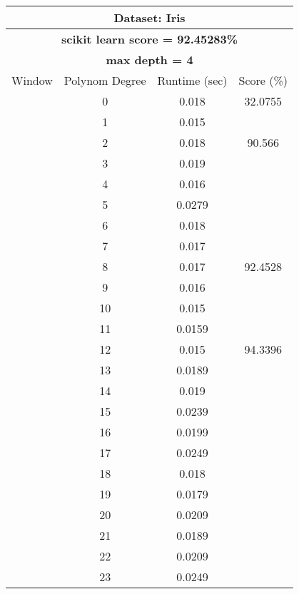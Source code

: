 \documentclass{article}
\begin{document}
\newpage
\begin{multicols}{2}
\begin{table}[H]
\caption{}
\label{tab:my-table}
\begin{tabular}{|c|c|c|c|}
\hline
\multicolumn{4}{|c|}{\textbf{Dataset: Iris}} \\ \hline
\multicolumn{4}{|c|}{\textbf{scikit learn score = 92.45283\%}} \\ \hline
\multicolumn{4}{|c|}{\textbf{max depth = 4}} \\ \hline
Window & Polynom Degree & Runtime (sec) & Score (\%) \\ \hline
 & 0 & 0.018 & 32.0755 \\ \cline{2-4} 
 & 1 & 0.015 &  \\ \cline{2-3}
 & 2 & 0.018 & \multirow{-2}{*}{90.566} \\ \cline{2-4} 
 & 3 & 0.019 &  \\ \cline{2-3}
 & 4 & 0.016 &  \\ \cline{2-3}
 & 5 & 0.0279 &  \\ \cline{2-3}
 & 6 & 0.018 &  \\ \cline{2-3}
 & 7 & 0.017 &  \\ \cline{2-3}
 & 8 & 0.017 & \multirow{-6}{*}{92.4528} \\ \cline{2-4} 
 & \cellcolor[HTML]{FFFFC7}9 & \cellcolor[HTML]{FFFFC7}0.016 & \cellcolor[HTML]{FFFFC7} \\ \cline{2-3}
 & 10 & 0.015 & \cellcolor[HTML]{FFFFC7} \\ \cline{2-3}
 & 11 & 0.0159 & \cellcolor[HTML]{FFFFC7} \\ \cline{2-3}
 & 12 & 0.015 & \multirow{-4}{*}{\cellcolor[HTML]{FFFFC7}94.3396} \\ \cline{2-4} 
 & 13 & 0.0189 &  \\ \cline{2-3}
 & 14 & 0.019 &  \\ \cline{2-3}
 & 15 & 0.0239 &  \\ \cline{2-3}
 & 16 & 0.0199 &  \\ \cline{2-3}
 & 17 & 0.0249 &  \\ \cline{2-3}
 & 18 & 0.018 &  \\ \cline{2-3}
 & 19 & 0.0179 &  \\ \cline{2-3}
 & 20 & 0.0209 &  \\ \cline{2-3}
 & 21 & 0.0189 &  \\ \cline{2-3}
 & 22 & 0.0209 &  \\ \cline{2-3}
 & 23 & 0.0249 &  \\ \cline{2-3}

\end{tabular}
\end{table}
\end{multicols}
\end{document}
